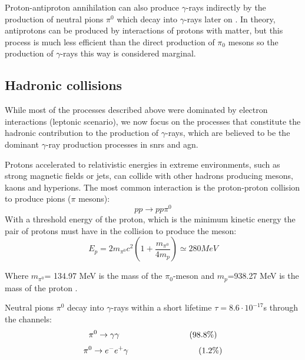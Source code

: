 \documentclass[main.tex]{subfiles}
\begin{document}
Proton-antiproton annihilation can also produce $\gamma$-rays indirectly by the production of neutral pions $\pi^0$ which decay into $\gamma$-rays later on \cite{1967protonantiproton}. In theory, antiprotons can be produced by interactions of protons with matter, but this process is much less efficient than the direct production of $\pi_0$ mesons \cite{weekes2003HEAstrophy} so the production of $\gamma$-rays this way is considered marginal. 

\subsection{Hadronic collisions}

While most of the processes described above were dominated by electron interactions (leptonic scenario), we now focus on the processes that constitute the hadronic contribution to the production of $\gamma$-rays, which are believed to be the dominant $\gamma$-ray production processes in \glspl{snr} and \gls{agn}. 

Protons accelerated to relativistic energies in extreme environments, such as strong magnetic fields or jets, can collide with other hadrons producing mesons, kaons and hyperions. The most common interaction is the proton-proton collision to produce pions ($\pi$ mesons):
\begin{equation}
    pp \rightarrow pp \pi^{0}
\end{equation}
With a threshold energy of the proton, which is the minimum kinetic energy the pair of protons must have in the collision to produce the meson:
\begin{equation}
    E_{p} = 2m_{\pi^{0}}c^{2}\left(1+\frac{m_{\pi^{0}}}{4m_{p}} \right) \simeq 280 MeV
\end{equation}

Where $m_{\pi^{0}}$= 134.97 MeV is the mass of the $\pi_{0}$-meson and $m_p$=938.27 MeV is the mass of the proton \cite{2004VHECosmicGammaRadiation}. 

Neutral pions $\pi^{0}$ decay into $\gamma$-rays within a short lifetime $\tau = 8.6 \cdot 10^{-17}$s through the channels:
\begin{equation}
    \pi^{0} \rightarrow \gamma\gamma 
    \\ \hspace{3cm}(98.8 \%)
\end{equation}
\begin{equation}
    \pi^{0} \rightarrow e^{-}e^{+}\gamma 
    \\ {}\hspace{3cm}(1.2 \%)
\end{equation}
\end{document}

